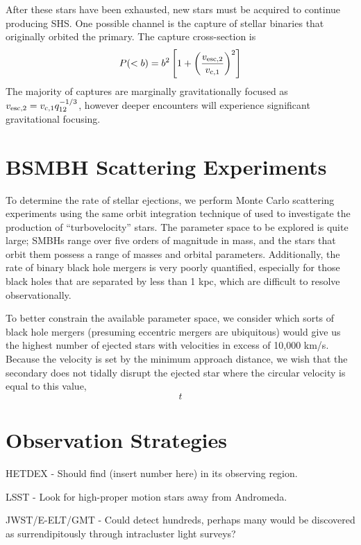 \documentclass[a4paper,twocolumn]{emulateapj}
\begin{document}
After these stars have been exhausted, new stars must be acquired to continue producing SHS. One possible channel is the capture of stellar binaries that originally orbited the primary. The capture cross-section is
\begin{equation}
P(< b) = b^2 \left[1 + \left(\frac{v_{\rm esc,2}}{v_{\rm c,1}}\right)^2 \right]
\end{equation}
The majority of captures are marginally gravitationally focused as $v_{\rm esc,2} = v_{\rm c,1} q_{12}^{-1/3}$, however deeper encounters will experience significant gravitational focusing.

\section{BSMBH Scattering Experiments}
To determine the rate of stellar ejections, we perform Monte Carlo scattering experiments using the same orbit integration technique of \citet{Manukian:2013a} used to investigate the production of ``turbovelocity'' stars. The parameter space to be explored is quite large; SMBHs range over five orders of magnitude in mass, and the stars that orbit them possess a range of masses and orbital parameters. Additionally, the rate of binary black hole mergers is very poorly quantified, especially for those black holes that are separated by less than 1 kpc, which are difficult to resolve observationally.

To better constrain the available parameter space, we consider which sorts of black hole mergers (presuming eccentric mergers are ubiquitous) would give us the highest number of ejected stars with velocities in excess of 10,000 km/s. Because the velocity is set by the minimum approach distance, we wish that the secondary does not tidally disrupt the ejected star where the circular velocity is equal to this value,
\begin{equation}
t
\end{equation}

\section{Observation Strategies}

HETDEX - Should find (insert number here) in its observing region.

LSST - Look for high-proper motion stars away from Andromeda.

JWST/E-ELT/GMT - Could detect hundreds, perhaps many would be discovered as surrendipitously through intracluster light surveys?
\end{document}
